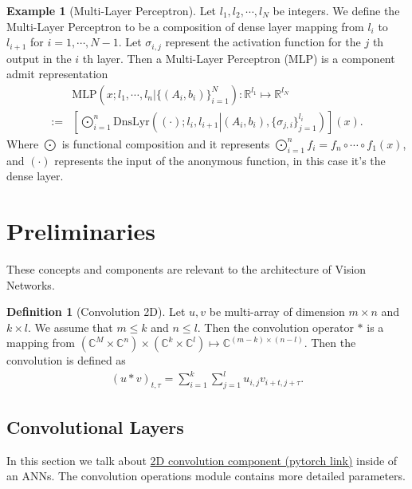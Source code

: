 \documentclass[]{article}
\theoremstyle{definition}
\newtheorem{definition}{Definition}
\newtheorem{example}{Example}[subsection]
\numberwithin{equation}{subsection}
\begin{document}
    \begin{example}[Multi-Layer Perceptron]
        Let $l_1, l_2, \cdots, l_N$ be integers. 
        We define the Multi-Layer Perceptron to be a composition of dense layer mapping from $l_{i}$ to $l_{i + 1}$ for $i = 1, \cdots, N - 1$. 
        Let $\sigma_{i, j}$ represent the activation function for the $j$ th output in the $i$ th layer. 
        Then a Multi-Layer Perceptron (MLP) is a component admit representation
        $$
        \begin{aligned}
            & \text{MLP}\left(x ; l_1, \cdots, l_n | \{(A_i, b_i)\}_{i=1}^N\right): \mathbb R^{l_1} \mapsto \mathbb R^{l_N}
            \\
            :=&
            \left[
            \bigodot_{i = 1}^n \text{DnsLyr}
            \left(
                (\cdot) ; l_i, l_{i + 1} \left| (A_i, b_i), \{\sigma_{j, i}\}_{j=1}^{l_i} \right.
            \right)
            \right](x). 
        \end{aligned}
        $$
        Where $\bigodot$ is functional composition and it represents $\bigodot_{i=1}^n f_i = f_n\circ\cdots\circ f_1(x)$, and $(\cdot)$ represents the input of the anonymous function, in this case it's the dense layer. 
    \end{example}

\section{Preliminaries}
    These concepts and components are relevant to the architecture of Vision Networks. 
    \begin{definition}[Convolution 2D]
        Let $u, v$ be multi-array of dimension $m \times n$ and $k \times l$. 
        We assume that $m \le  k$ and $n \le l$.
        Then the convolution operator $*$ is a mapping from $(\mathbb C^M \times \mathbb C^n)\times (\mathbb C^k \times \mathbb C^l) \mapsto \mathbb C^{(m - k)\times (n - l)}$. 
        Then the convolution is defined as 
        $$
        \begin{aligned}
            (u* v)_{t, \tau} = 
            \sum_{i = 1}^{k}\sum_{j = 1}^{l}u_{i, j}v_{i + t, j + \tau}. 
        \end{aligned}
        $$
    \end{definition}

    \subsection{Convolutional Layers}
        In this section we talk about \href{https://pytorch.org/docs/stable/generated/torch.nn.Conv2d.html}{2D convolution component (pytorch link)} inside of an ANNs. 
        The convolution operations module contains more detailed parameters. 
        
\end{document}
